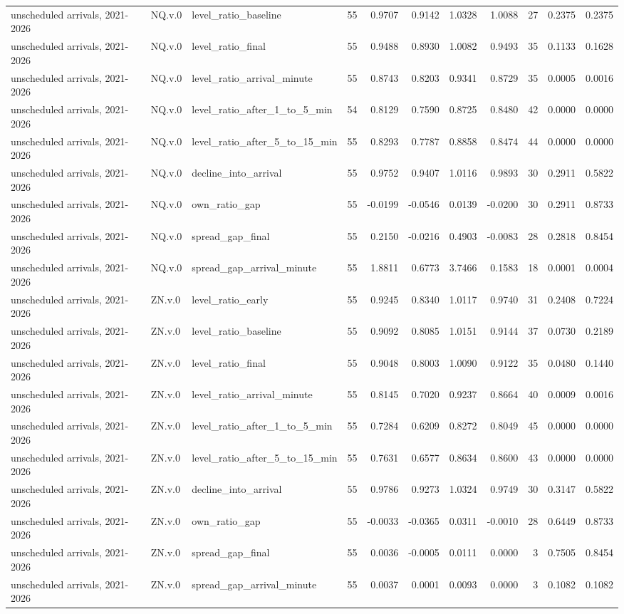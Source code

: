\begin{tabular}{lllrrrrrrrr}
unscheduled arrivals, 2021-2026 & NQ.v.0 & level_ratio_baseline & 55 & 0.9707 & 0.9142 & 1.0328 & 1.0088 & 27 & 0.2375 & 0.2375 \\
unscheduled arrivals, 2021-2026 & NQ.v.0 & level_ratio_final & 55 & 0.9488 & 0.8930 & 1.0082 & 0.9493 & 35 & 0.1133 & 0.1628 \\
unscheduled arrivals, 2021-2026 & NQ.v.0 & level_ratio_arrival_minute & 55 & 0.8743 & 0.8203 & 0.9341 & 0.8729 & 35 & 0.0005 & 0.0016 \\
unscheduled arrivals, 2021-2026 & NQ.v.0 & level_ratio_after_1_to_5_min & 54 & 0.8129 & 0.7590 & 0.8725 & 0.8480 & 42 & 0.0000 & 0.0000 \\
unscheduled arrivals, 2021-2026 & NQ.v.0 & level_ratio_after_5_to_15_min & 55 & 0.8293 & 0.7787 & 0.8858 & 0.8474 & 44 & 0.0000 & 0.0000 \\
unscheduled arrivals, 2021-2026 & NQ.v.0 & decline_into_arrival & 55 & 0.9752 & 0.9407 & 1.0116 & 0.9893 & 30 & 0.2911 & 0.5822 \\
unscheduled arrivals, 2021-2026 & NQ.v.0 & own_ratio_gap & 55 & -0.0199 & -0.0546 & 0.0139 & -0.0200 & 30 & 0.2911 & 0.8733 \\
unscheduled arrivals, 2021-2026 & NQ.v.0 & spread_gap_final & 55 & 0.2150 & -0.0216 & 0.4903 & -0.0083 & 28 & 0.2818 & 0.8454 \\
unscheduled arrivals, 2021-2026 & NQ.v.0 & spread_gap_arrival_minute & 55 & 1.8811 & 0.6773 & 3.7466 & 0.1583 & 18 & 0.0001 & 0.0004 \\
unscheduled arrivals, 2021-2026 & ZN.v.0 & level_ratio_early & 55 & 0.9245 & 0.8340 & 1.0117 & 0.9740 & 31 & 0.2408 & 0.7224 \\
unscheduled arrivals, 2021-2026 & ZN.v.0 & level_ratio_baseline & 55 & 0.9092 & 0.8085 & 1.0151 & 0.9144 & 37 & 0.0730 & 0.2189 \\
unscheduled arrivals, 2021-2026 & ZN.v.0 & level_ratio_final & 55 & 0.9048 & 0.8003 & 1.0090 & 0.9122 & 35 & 0.0480 & 0.1440 \\
unscheduled arrivals, 2021-2026 & ZN.v.0 & level_ratio_arrival_minute & 55 & 0.8145 & 0.7020 & 0.9237 & 0.8664 & 40 & 0.0009 & 0.0016 \\
unscheduled arrivals, 2021-2026 & ZN.v.0 & level_ratio_after_1_to_5_min & 55 & 0.7284 & 0.6209 & 0.8272 & 0.8049 & 45 & 0.0000 & 0.0000 \\
unscheduled arrivals, 2021-2026 & ZN.v.0 & level_ratio_after_5_to_15_min & 55 & 0.7631 & 0.6577 & 0.8634 & 0.8600 & 43 & 0.0000 & 0.0000 \\
unscheduled arrivals, 2021-2026 & ZN.v.0 & decline_into_arrival & 55 & 0.9786 & 0.9273 & 1.0324 & 0.9749 & 30 & 0.3147 & 0.5822 \\
unscheduled arrivals, 2021-2026 & ZN.v.0 & own_ratio_gap & 55 & -0.0033 & -0.0365 & 0.0311 & -0.0010 & 28 & 0.6449 & 0.8733 \\
unscheduled arrivals, 2021-2026 & ZN.v.0 & spread_gap_final & 55 & 0.0036 & -0.0005 & 0.0111 & 0.0000 & 3 & 0.7505 & 0.8454 \\
unscheduled arrivals, 2021-2026 & ZN.v.0 & spread_gap_arrival_minute & 55 & 0.0037 & 0.0001 & 0.0093 & 0.0000 & 3 & 0.1082 & 0.1082 \\
\bottomrule
\end{tabular}
